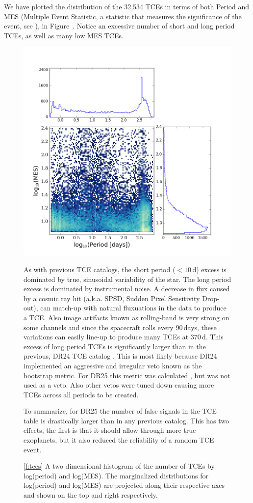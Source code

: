 We have plotted the distribution of the 32,534 TCEs in terms of both Period and MES (Multiple Event Statistic, a statistic that measures the significance of the event, see \citep{Jenkins2002a}), in Figure~\label{f:tces}. Notice an excessive number of short and long period TCEs, as well as many low MES TCEs.  

\begin{figure}
 \begin{center}
  \includegraphics[width=\linewidth]{tce-dist.png}
  \caption{\ref{f:tces} A two dimensional histogram of the number of TCEs by log(period) and log(MES). The marginalized distributions for log(period) and log(MES) are projected along their respective axes and shown on the top and right respectively. }
 \end{center}

As with previous TCE catalogs, the short period ($\lt 10$\,d) excess is dominated by true, sinusoidal variability of the star. The long period excess is dominated by instrumental noise. A decrease in flux caused by a cosmic ray hit (a.k.a. SPSD, Sudden Pixel Sensitivity Drop-out), can match-up with natural fluxuations in the data to produce a TCE. Also image artifacts known as rolling-band is very strong on some channels \citep[see p??][]{KDCH} and since the spacecraft rolls every 90\,days, these variations can easily line-up to produce many TCEs at 370\,d.  This excess of long period TCEs is significantly larger than in the previous, DR24 TCE catalog \citep{Seader2015}. This is most likely because DR24 implemented an aggressive and irregular veto known as the bootstrap metric.  For DR25 this metric was calculated \citep{Jenkins2016}, but was not used as a veto.  Also other vetos were tuned down causing more TCEs across all periods to be created.

To summarize, for DR25 the number of false signals in the TCE table is drastically larger than in any previous catalog. This has two effects, the first is that it should allow through more true exoplanets, but it also reduced the reliability of a random TCE event. 


\end{figure}
